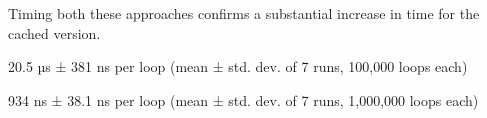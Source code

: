 Timing both these approaches confirms a substantial increase in time for the
cached version.

\begin{pyin}
\end{pyin}





\begin{raw}
20.5 µs ± 381 ns per loop (mean ± std. dev. of 7 runs, 100,000 loops each)
\end{raw}











\begin{pyin}
\end{pyin}





\begin{raw}
934 ns ± 38.1 ns per loop (mean ± std. dev. of 7 runs, 1,000,000 loops each)
\end{raw}
